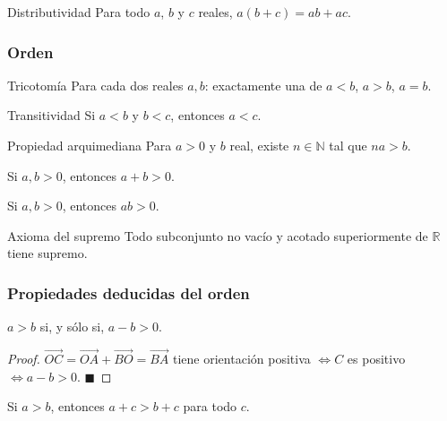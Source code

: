 \documentclass[12pt]{article}
\begin{document}
\begin{axioma}[D1]{Distributividad}
Para todo $a$, $b$ y $c$ reales, $a(b+c) = ab + ac$.
\end{axioma}

\subsubsection{Orden}

\begin{axioma}[O1]{Tricotomía}
Para cada dos reales $a, b$: exactamente una de $a < b$, $a > b$, $a = b$.
\end{axioma}

\begin{axioma}[O2]{Transitividad}
Si $a < b$ y $b < c$, entonces $a < c$.
\end{axioma}

\begin{axioma}[O3]{Propiedad arquimediana}
Para $a > 0$ y $b$ real, existe $n \in \mathbb{N}$ tal que $na > b$.
\end{axioma}

\begin{axioma}[O4]{}
Si $a, b > 0$, entonces $a + b > 0$.
\end{axioma}

\begin{axioma}[O5]{}
Si $a, b > 0$, entonces $ab > 0$.
\end{axioma}

\begin{axioma}[O6]{Axioma del supremo}
Todo subconjunto no vacío y acotado superiormente de $\mathbb{R}$ tiene supremo.
\end{axioma}

\subsubsection{Propiedades deducidas del orden}

\begin{proposicion}[1]{}
$a > b$ si, y sólo si, $a - b > 0$.
\end{proposicion}

\begin{proof}
$\overrightarrow{OC} = \overrightarrow{OA} + \overrightarrow{BO} = \overrightarrow{BA}$ tiene orientación positiva $\iff C$ es positivo $\iff a - b > 0$.
$\blacksquare$
\end{proof}

\begin{proposicion}[2]{}
Si $a > b$, entonces $a + c > b + c$ para todo $c$.
\end{proposicion}
\end{document}
